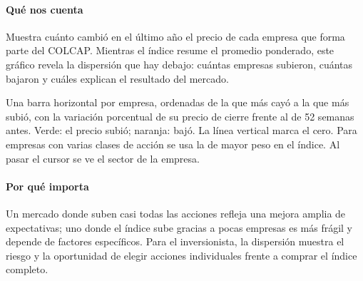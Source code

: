 \paragraph{Qué nos cuenta}
Muestra cuánto cambió en el último año el precio de cada empresa que forma parte del COLCAP. Mientras el índice resume el promedio ponderado, este gráfico revela la dispersión que hay debajo: cuántas empresas subieron, cuántas bajaron y cuáles explican el resultado del mercado.

\begin{leer}
Una barra horizontal por empresa, ordenadas de la que más cayó a la que más subió, con la variación porcentual de su precio de cierre frente al de 52 semanas antes. Verde: el precio subió; naranja: bajó. La línea vertical marca el cero. Para empresas con varias clases de acción se usa la de mayor peso en el índice. Al pasar el cursor se ve el sector de la empresa.
\end{leer}

\paragraph{Por qué importa}
Un mercado donde suben casi todas las acciones refleja una mejora amplia de expectativas; uno donde el índice sube gracias a pocas empresas es más frágil y depende de factores específicos. Para el inversionista, la dispersión muestra el riesgo y la oportunidad de elegir acciones individuales frente a comprar el índice completo.

